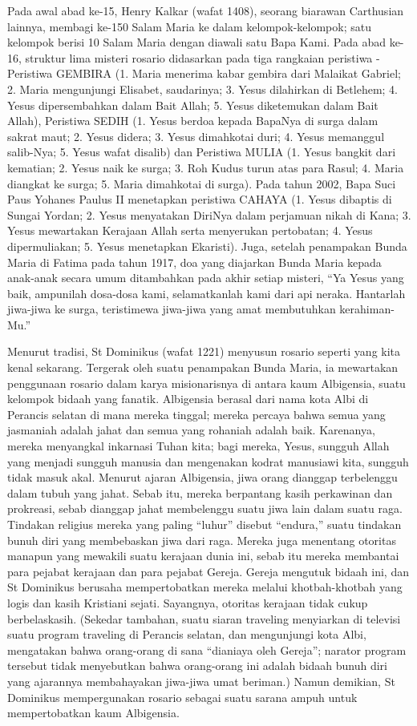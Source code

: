 Pada awal abad ke-15, Henry Kalkar (wafat 1408), seorang biarawan Carthusian lainnya, membagi ke-150 Salam Maria ke dalam kelompok-kelompok; satu kelompok berisi 10 Salam Maria dengan diawali satu Bapa Kami. Pada abad ke-16, struktur lima misteri rosario didasarkan pada tiga rangkaian peristiwa - Peristiwa GEMBIRA (1. Maria menerima kabar gembira dari Malaikat Gabriel; 2. Maria mengunjungi Elisabet, saudarinya; 3. Yesus dilahirkan di Betlehem; 4. Yesus dipersembahkan dalam Bait Allah; 5. Yesus diketemukan dalam Bait Allah), Peristiwa SEDIH (1. Yesus berdoa kepada BapaNya di surga dalam sakrat maut; 2. Yesus didera; 3. Yesus dimahkotai duri; 4. Yesus memanggul salib-Nya; 5. Yesus wafat disalib) dan Peristiwa MULIA (1. Yesus bangkit dari kematian; 2. Yesus naik ke surga; 3. Roh Kudus turun atas para Rasul; 4. Maria diangkat ke surga; 5. Maria dimahkotai di surga). Pada tahun 2002, Bapa Suci Paus Yohanes Paulus II menetapkan peristiwa CAHAYA (1. Yesus dibaptis di Sungai Yordan; 2. Yesus menyatakan DiriNya dalam perjamuan nikah di Kana; 3. Yesus mewartakan Kerajaan Allah serta menyerukan pertobatan; 4. Yesus dipermuliakan; 5. Yesus menetapkan Ekaristi). Juga, setelah penampakan Bunda Maria di Fatima pada tahun 1917, doa yang diajarkan Bunda Maria kepada anak-anak secara umum ditambahkan pada akhir setiap misteri, ``Ya Yesus yang baik, ampunilah dosa-dosa kami, selamatkanlah kami dari api neraka. Hantarlah jiwa-jiwa ke surga, teristimewa jiwa-jiwa yang amat membutuhkan kerahiman-Mu.''

Menurut tradisi, St Dominikus (wafat 1221) menyusun rosario seperti yang kita kenal sekarang. Tergerak oleh suatu penampakan Bunda Maria, ia mewartakan penggunaan rosario dalam karya misionarisnya di antara kaum Albigensia, suatu kelompok bidaah yang fanatik. Albigensia berasal dari nama kota Albi di Perancis selatan di mana mereka tinggal; mereka percaya bahwa semua yang jasmaniah adalah jahat dan semua yang rohaniah adalah baik. Karenanya, mereka menyangkal inkarnasi Tuhan kita; bagi mereka, Yesus, sungguh Allah yang menjadi sungguh manusia dan mengenakan kodrat manusiawi kita, sungguh tidak masuk akal. Menurut ajaran Albigensia, jiwa orang dianggap terbelenggu dalam tubuh yang jahat. Sebab itu, mereka berpantang kasih perkawinan dan prokreasi, sebab dianggap jahat membelenggu suatu jiwa lain dalam suatu raga. Tindakan religius mereka yang paling ``luhur'' disebut ``endura,'' suatu tindakan bunuh diri yang membebaskan jiwa dari raga. Mereka juga menentang otoritas manapun yang mewakili suatu kerajaan dunia ini, sebab itu mereka membantai para pejabat kerajaan dan para pejabat Gereja. Gereja mengutuk bidaah ini, dan St Dominikus berusaha mempertobatkan mereka melalui khotbah-khotbah yang logis dan kasih Kristiani sejati. Sayangnya, otoritas kerajaan tidak cukup berbelaskasih. (Sekedar tambahan, suatu siaran traveling menyiarkan di televisi suatu program traveling di Perancis selatan, dan mengunjungi kota Albi, mengatakan bahwa orang-orang di sana ``dianiaya oleh Gereja''; narator program tersebut tidak menyebutkan bahwa orang-orang ini adalah bidaah bunuh diri yang ajarannya membahayakan jiwa-jiwa umat beriman.) Namun demikian, St Dominikus mempergunakan rosario sebagai suatu sarana ampuh untuk mempertobatkan kaum Albigensia.

